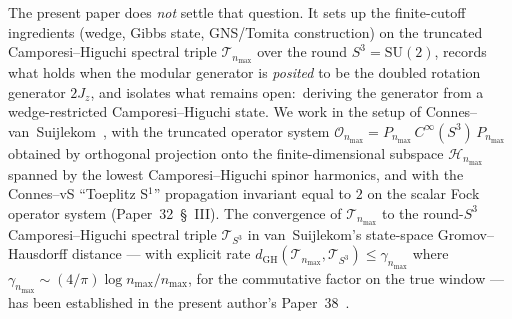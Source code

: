 \documentclass[11pt,a4paper]{article}
\theoremstyle{plain}
\theoremstyle{definition}
\newcommand{\nmax}{n_{\max}}
\newcommand{\sthree}{S^{3}}
\newcommand{\Hilb}{\mathcal{H}}
\newcommand{\Op}{\mathcal{O}}
\newcommand{\Tcal}{\mathcal{T}}
\newcommand{\SU}{\mathrm{SU}}
\begin{document}
The present paper does \emph{not} settle that question.  It sets up
the finite-cutoff ingredients (wedge, Gibbs state, GNS/Tomita
construction) on the truncated Camporesi--Higuchi spectral triple
$\Tcal_{\nmax}$ over the round $\sthree = \SU(2)$, records what holds
when the modular generator is \emph{posited} to be the doubled
rotation generator $2J_z$, and isolates what remains open:\ deriving
the generator from a wedge-restricted Camporesi--Higuchi state.
We work in the setup of
Connes--van~Suijlekom~\cite{connes_vs2021}, with the truncated
operator system $\Op_{\nmax} = P_{\nmax} \, C^\infty(\sthree) \,
P_{\nmax}$ obtained by orthogonal projection onto the
finite-dimensional subspace $\Hilb_{\nmax}$ spanned by the lowest
Camporesi--Higuchi spinor harmonics, and with the Connes--vS
``Toeplitz S$^1$'' propagation invariant equal to $2$ on the scalar
Fock operator system (Paper~32~\S~III). The convergence of
$\Tcal_{\nmax}$ to the round-$\sthree$ Camporesi--Higuchi spectral
triple $\Tcal_{\sthree}$ in van~Suijlekom's state-space
Gromov--Hausdorff distance --- with explicit rate
$d_{\mathrm{GH}}(\Tcal_{\nmax}, \Tcal_{\sthree}) \le \gamma_{\nmax}$
where $\gamma_{\nmax} \sim (4/\pi) \log \nmax / \nmax$, for the
commutative factor on the true window --- has been established in the present author's Paper~38~\cite{paper38}.
\end{document}
